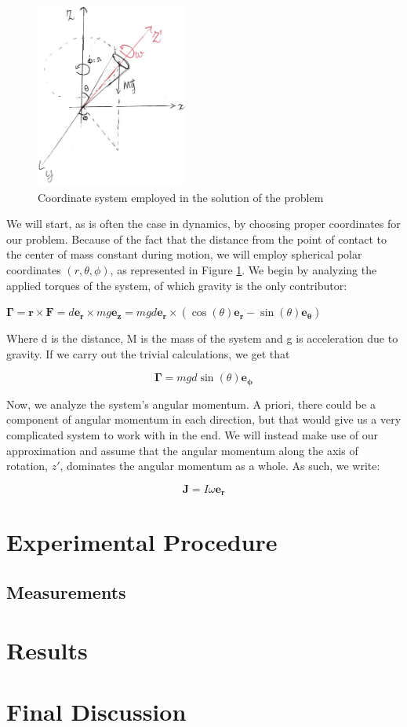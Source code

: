 \documentclass[a4paper,12pt]{article}
\begin{document}
\begin{figure}[h!]
\centering
\label{coord_system}
\caption{Coordinate system employed in the solution of the problem}
\includegraphics[width=5cm]{coord.jpg}
\end{figure} 

We will start, as is often the case in dynamics, by choosing proper coordinates for our problem. Because of the fact that the distance from the point of contact to the center of mass constant during motion, we will employ spherical polar coordinates $(r,\theta,\phi)$, as represented in Figure \ref{coord_system}. We begin by analyzing the applied torques of the system, of which gravity is the only contributor:

$\boldsymbol{\Gamma} = \boldsymbol{r} \times \boldsymbol{F} = d \boldsymbol{e_r} \times m g \boldsymbol{e_z} = m g d \boldsymbol{e_r} \times (\cos(\theta) \boldsymbol{e_r}-\sin(\theta) \boldsymbol{e_\theta})$

Where d is the distance, M is the mass of the system and g is acceleration due to gravity. If we carry out the trivial calculations, we get that 

\begin{equation}
	\label{torque}
	\boldsymbol{\Gamma} = m g d \sin(\theta) \boldsymbol{e_{\phi}}
\end{equation}

Now, we analyze the system's angular momentum. A priori, there could be a component of angular momentum in each direction, but that would give us a very complicated system to work with in the end. We will instead make use of our approximation and assume that the angular momentum along the axis of rotation, $z'$, dominates the angular momentum as a whole. As such, we write:

\begin{equation}
	\boldsymbol{J} = I \omega \boldsymbol{e_r}
\end{equation}


\section{Experimental Procedure}

\subsection{Measurements}

\section{Results}

\section{Final Discussion}
\end{document}
